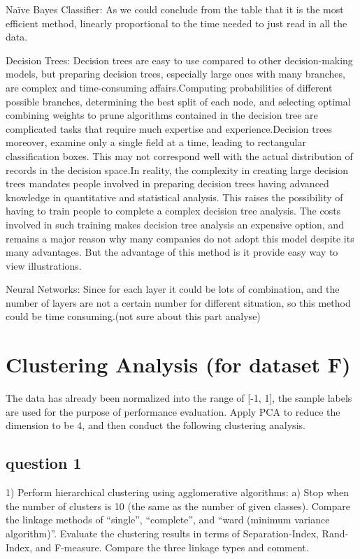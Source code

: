 \documentclass[]{article}
\begin{document}
Naïve Bayes Classifier: As we could conclude from the table that it is the most efficient method, linearly proportional to the time needed to just read in all the data.

Decision Trees: Decision trees are easy to use compared to other decision-making models, but preparing decision trees, especially large ones with many branches, are complex and time-consuming affairs.Computing probabilities of different possible branches, determining the best split of each node, and selecting optimal combining weights to prune algorithms contained in the decision tree are complicated tasks that require much expertise and experience.Decision trees moreover, examine only a single field at a time, leading to rectangular classification boxes. This may not correspond well with the actual distribution of records in the decision space.In reality, the complexity in creating large decision trees mandates people involved in preparing decision trees having advanced knowledge in quantitative and statistical analysis. This raises the possibility of having to train people to complete a complex decision tree analysis. The costs involved in such training makes decision tree analysis an expensive option, and remains a major reason why many companies do not adopt this model despite its many advantages. But the advantage of this method is it provide easy way to view illustrations.


Neural Networks: Since for each layer it could be lots of combination, and the number of layers are not a certain number for different situation, so this method could be time consuming.(not sure about this part analyse)



\section{Clustering Analysis (for dataset F)}
The data has already been normalized into the range of [-1, 1], the sample labels are used for the purpose of performance evaluation.
Apply PCA to reduce the dimension to be 4, and then conduct the following clustering analysis.
\subsection{question 1}
1) Perform hierarchical clustering using agglomerative algorithms:
a) Stop when the number of clusters is 10 (the same as the number of given classes). Compare the linkage methods of “single”, “complete”, and “ward (minimum variance algorithm)”. Evaluate the clustering results in terms of Separation-Index, Rand-Index, and F-measure. Compare the three linkage types and comment.
\end{document}
